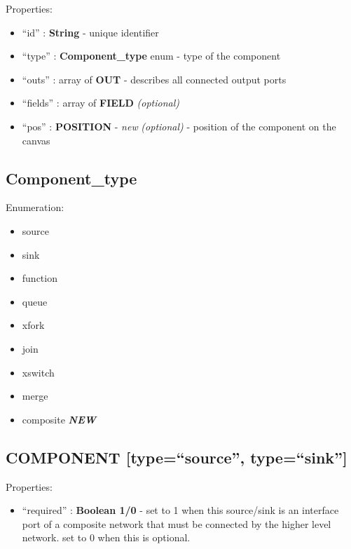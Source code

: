 Properties:

\begin{itemize}
\itemsep1pt\parskip0pt
\item
  ``id'' : \textbf{String} - unique identifier
\item
  ``type'' : \textbf{Component\_type} enum - type of the component
\item
  ``outs'' : array of \textbf{OUT} - describes all connected output
  ports
\item
  ``fields'' : array of \textbf{FIELD} \emph{(optional)}
\item
  ``pos'' : \textbf{POSITION} - \emph{new} \emph{(optional)} - position of the component
  on the canvas
\end{itemize}

\subsection{Component\_type}\label{componentux5ftype}

Enumeration:

\begin{itemize}
\itemsep1pt\parskip0pt
\item
  source
\item
  sink
\item
  function
\item
  queue
\item
  xfork
\item
  join
\item
  xswitch
\item
  merge
\item
  composite \textbf{\emph{NEW}}
\end{itemize}

\subsection{COMPONENT {[}type=``source'',
type=``sink''{]}}\label{component-typesource-typesink}

Properties:

\begin{itemize}
\itemsep1pt\parskip0pt
\item
  ``required'' : \textbf{Boolean 1/0} - set to 1 when this source/sink
  is an interface port of a composite network that must be connected by
  the higher level network. set to 0 when this is optional.
\end{itemize}

